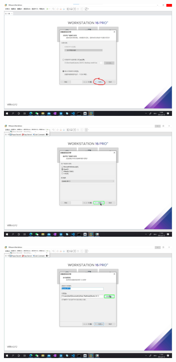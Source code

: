 \documentclass[UTF8]{ctexart}
\begin{document}
    \begin{figure}[H]
        \centering
        \includegraphics[width=0.8\textwidth]{assets/u5.png}
    \end{figure}
    \begin{figure}[H]
        \centering
        \includegraphics[width=0.8\textwidth]{assets/u6.png}
    \end{figure}
    \begin{figure}[H]
        \centering
        \includegraphics[width=0.8\textwidth]{assets/u7.png}
    \end{figure}
\end{document}
